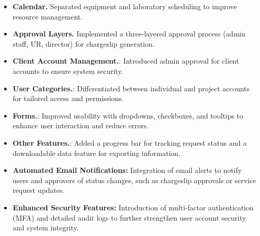 \begin{itemize}
	\item \textbf{Calendar.} Separated equipment and laboratory scheduling to improve resource management.
	\item \textbf{Approval Layers.} Implemented a three-layered approval process (admin staff, UR, director) for chargeslip generation.
	\item \textbf{Client Account Management.}: Introduced admin approval for client accounts to ensure system security.
	\item \textbf{User Categories.}: Differentiated between individual and project accounts for tailored access and permissions.
	\item \textbf{Forms.}: Improved usability with dropdowns, checkboxes, and tooltips to enhance user interaction and reduce errors.
	\item \textbf{Other Features.}: Added a progress bar for tracking request status and a downloadable data feature for exporting information.
	\item \textbf{Automated Email Notifications:} Integration of email alerts to notify users and approvers of status changes, such as chargeslip approvals or service request updates.
	\item \textbf{Enhanced Security Features:} Introduction of multi-factor authentication (MFA) and detailed audit logs to further strengthen user account security and system integrity.
\end{itemize}

